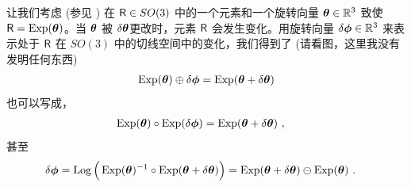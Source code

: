 让我们考虑 (参见 ) 在 $\sR\in SO(3)$ 中的一个元素和一个旋转向量 $\bth\in\bbR^3$ 致使 $\sR=\Exp(\bth)$。当 $\bth$ 被 $\dth$更改时，元素 $\sR$ 会发生变化。用旋转向量 $\delta\bfphi\in\bbR^3$ 来表示处于 $\sR$ 在 $SO(3)$ 中的切线空间中的变化，我们得到了 (请看图，这里我没有发明任何东西)
%
\begin{align}
\Exp(\bth)\oplus\delta\bfphi = \Exp(\bth+\dth)
\end{align}
%
也可以写成，
%
\begin{align}
\Exp(\bth)\circ\Exp(\delta\bfphi) &= \Exp(\bth+\dth)
~,
\end{align}
%
甚至
%
\begin{align}
\delta\bfphi &= \Log\Big(\Exp(\bth)\inv\circ\Exp(\bth+\dth)\Big) = \Exp(\bth+\dth) \ominus \Exp(\bth)
~.
\end{align}

